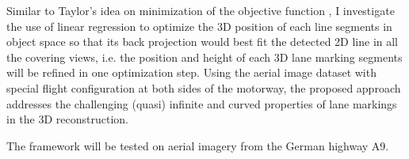 Similar to Taylor’s idea on minimization of the objective function \cite{TaylorNov1995}, I investigate the use of linear regression to optimize the 3D position of each line segments in object space so that its back projection would best fit the detected 2D line in all the covering views, i.e. the position and height of each 3D lane marking segments will be refined in one optimization step. Using the aerial image dataset with special flight configuration at both sides of the motorway, the proposed approach addresses the challenging (quasi) infinite and curved properties of lane markings in the 3D reconstruction.

The framework will be tested on aerial imagery from the German highway A9.%
